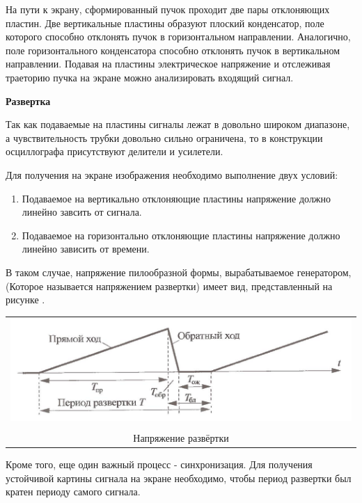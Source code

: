 \documentclass[a4paper,12pt]{article}
\begin{document}
	На пути к экрану, сформированный пучок проходит две пары отклоняющих пластин. Две вертикальные пластины образуют плоский конденсатор, поле которого способно отклонять пучок в горизонтальном направлении. Аналогично, поле горизонтального конденсатора способно отклонять пучок в вертикальном направлении. Подавая на пластины электрическое напряжение и отслеживая траеторию пучка на экране можно анализировать входящий сигнал.
	
	\textbf{Развертка}
	
	Так как подаваемые на пластины сигналы лежат в довольно широком диапазоне, а чувствительность трубки довольно сильно ограничена, то в конструкции осциллографа присутствуют делители и усилетели.
	
	Для получения на экране изображения необходимо выполнение двух условий:
	
	\begin{enumerate}
		\item Подаваемое на вертикально отклоняющие пластины напряжение должно линейно завсить от сигнала.
		\item Подаваемое на горизонтально отклоняющие пластины напряжение должно линейно зависить от времени.
	\end{enumerate}
	
	В таком случае, напряжение пилообразной формы, вырабатываемое генератором, (Которое называется напряжением развертки) имеет вид, представленный на рисунке .
	
	


		\begin{center}
	\begin{tabular}{c}
		
		\includegraphics[width=0.7\linewidth]{pic3.jpg}\\
		\\	Напряжение развёртки
		
	\end{tabular}
\end{center}
	
	Кроме того, еще один важный процесс - синхронизация. Для получения устойчивой картины сигнала на экране необходимо, чтобы период развертки был кратен периоду самого сигнала.
	
\end{document}

